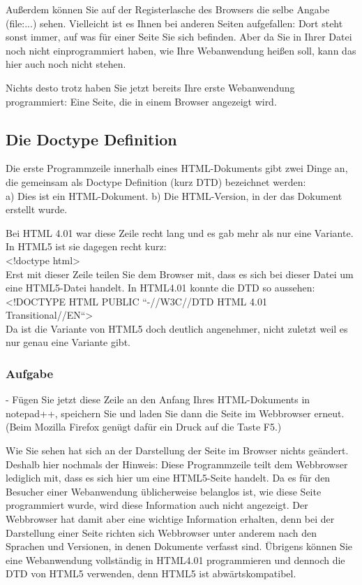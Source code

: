 Außerdem können Sie auf der Registerlasche des Browsers die selbe Angabe (file:...) sehen. Vielleicht ist es Ihnen bei anderen Seiten aufgefallen: Dort steht sonst immer, auf was für einer Seite Sie sich befinden. Aber da Sie in Ihrer Datei noch nicht einprogrammiert haben, wie Ihre Webanwendung heißen soll, kann das hier auch noch nicht stehen.

Nichts desto trotz haben Sie jetzt bereits Ihre erste Webanwendung programmiert: Eine Seite, die in einem Browser angezeigt wird.\\

\subsection{Die Doctype Definition}

Die erste Programmzeile innerhalb eines HTML-Dokuments gibt zwei Dinge an, die gemeinsam als Doctype Definition (kurz DTD) bezeichnet werden:\\

a)	Dies ist ein HTML-Dokument.
b)	Die HTML-Version, in der das Dokument erstellt wurde.

Bei HTML 4.01 war diese Zeile recht lang und es gab mehr als nur eine Variante. In HTML5 ist sie dagegen recht kurz:\\

<!doctype html>\\

Erst mit dieser Zeile teilen Sie dem Browser mit, dass es sich bei dieser Datei um eine HTML5-Datei handelt. In HTML4.01 konnte die DTD so aussehen: \\

<!DOCTYPE HTML PUBLIC ``-//W3C//DTD HTML 4.01 Transitional//EN``> \\

Da ist die Variante von HTML5 doch deutlich angenehmer, nicht zuletzt weil es nur genau eine Variante gibt.

\subsubsection{Aufgabe}

-	Fügen Sie jetzt diese Zeile an den Anfang Ihres HTML-Dokuments in notepad++, speichern Sie und laden Sie dann die Seite im Webbrowser erneut. (Beim Mozilla Firefox genügt dafür ein Druck auf die Taste F5.)

Wie Sie sehen hat sich an der Darstellung der Seite im Browser nichts geändert. Deshalb hier nochmals der Hinweis: Diese Programmzeile teilt dem Webbrowser lediglich mit, dass es sich hier um eine HTML5-Seite handelt. Da es für den Besucher einer Webanwendung üblicherweise belanglos ist, wie diese Seite programmiert wurde, wird diese Information auch nicht angezeigt. Der Webbrowser hat damit aber eine wichtige Information erhalten, denn bei der Darstellung einer Seite richten sich Webbrowser unter anderem nach den Sprachen und Versionen, in denen Dokumente verfasst sind.
Übrigens können Sie eine Webanwendung vollständig in HTML4.01 programmieren und dennoch die DTD von HTML5 verwenden, denn HTML5 ist abwärtskompatibel.

